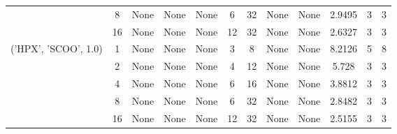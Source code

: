 \begin{tabular}{cccccccccccc}
& 8& None& None& None& 6& 32& None& None& 2.9495& 3& 3\\
& 16& None& None& None& 12& 32& None& None& 2.6327& 3& 3\\
\hline
\multirow{5}{*}{('HPX', 'SCOO', 1.0)}& 1& None& None& None& 3& 8& None& None& 8.2126& 5& 8\\
& 2& None& None& None& 4& 12& None& None& 5.728& 3& 3\\
& 4& None& None& None& 6& 16& None& None& 3.8812& 3& 3\\
& 8& None& None& None& 6& 32& None& None& 2.8482& 3& 3\\
& 16& None& None& None& 12& 32& None& None& 2.5155& 3& 3\\
\hline
\end{tabular}
